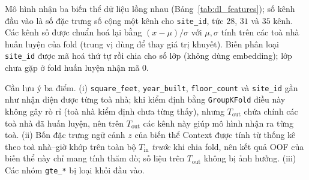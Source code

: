 Mô hình nhận ba biến thể dữ liệu lồng nhau (Bảng~\ref{tab:dl_features}); số kênh đầu vào là số đặc trưng số cộng một kênh cho \texttt{site\_id}, tức $28$, $31$ và $35$ kênh. Các kênh số được chuẩn hoá lại bằng $(x - \mu)/\sigma$ với $\mu, \sigma$ tính trên các toà nhà huấn luyện của fold (trung vị dùng để thay giá trị khuyết). Biến phân loại \texttt{site\_id} được mã hoá thứ tự rồi chia cho số lớp (không dùng embedding); lớp chưa gặp ở fold huấn luyện nhận mã $0$.

\begin{table}[H]
\centering
\caption{\textbf{Các nhóm đặc trưng đầu vào của mô hình Học sâu theo ba biến thể}}
\label{tab:dl_features}
\renewcommand{\arraystretch}{1.2}
\end{table}

Cần lưu ý ba điểm. (i) \texttt{square\_feet}, \texttt{year\_built}, \texttt{floor\_count} và \texttt{site\_id} gần như nhận diện được từng toà nhà; khi kiểm định bằng \texttt{GroupKFold} điều này không gây rò rỉ (toà nhà kiểm định chưa từng thấy), nhưng $T_{\text{out}}$ chứa chính các toà nhà đã huấn luyện, nên trên $T_{\text{out}}$ các kênh này giúp mô hình nhận ra từng toà. (ii) Bốn đặc trưng ngữ cảnh $z$ của biến thể Context được tính từ thống kê theo toà nhà--giờ khớp trên toàn bộ $T_{\text{in}}$ \textit{trước} khi chia fold, nên kết quả OOF của biến thể này chỉ mang tính thăm dò; số liệu trên $T_{\text{out}}$ không bị ảnh hưởng. (iii) Các nhóm \texttt{gte\_*} bị loại khỏi đầu vào.

